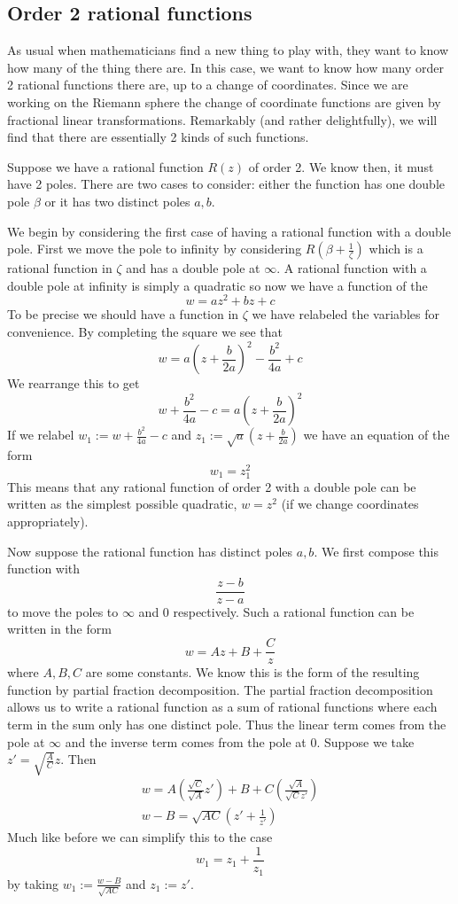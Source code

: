 \subsection{Order 2 rational functions}
As usual when mathematicians find a new thing to play with, they want to know how many of the thing there are. In this case, we want to know how many order 2 rational functions there are, up to a change of coordinates. Since we are working on the Riemann sphere the change of coordinate functions are given by fractional linear transformations. Remarkably (and rather delightfully), we will find that there are essentially 2 kinds of such functions.

Suppose we have a rational function $R(z)$ of order 2. We know then, it must have 2 poles. There are two cases to consider: either the function has one double pole $\beta$ or it has two distinct poles $a, b$.

We begin by considering the first case of having a rational function with a double pole. First we move the pole to infinity by considering $R\left( \beta + \frac{1}{\zeta} \right)$ which is a rational function in $\zeta$ and has a double pole at $\infty$. A rational function with a double pole at infinity is simply a quadratic so now we have a function of the 
$$ w = az^2 + bz + c $$
To be precise we should have a function in $\zeta$ we have relabeled the variables for convenience. By completing the square we see that 
$$ w = a \left( z + \frac{b}{2a} \right)^2 - \frac{b^2}{4a} + c $$
We rearrange this to get 
$$ w + \frac{b^2}{4a} - c = a \left( z + \frac{b}{2a} \right)^2 $$
If we relabel $w_1 := w + \frac{b^2}{4a} - c$ and $z_1 := \sqrt{a} \left( z + \frac{b}{2a} \right)$ we have an equation of the form 
$$w_1 = z_1^2$$
This means that any rational function of order 2 with a double pole can be written as the simplest possible quadratic, $w = z^2$ (if we change coordinates appropriately). 

Now suppose the rational function has distinct poles $a, b$. We first compose this function with 
$$ \frac{z - b}{z - a} $$
to move the poles to $\infty$ and $0$ respectively. Such a rational function can be written in the form
$$ w = Az + B + \frac{C}{z} $$
where $A, B, C$ are some constants. We know this is the form of the resulting function by partial fraction decomposition. The partial fraction decomposition allows us to write a rational function as a sum of rational functions where each term in the sum only has one distinct pole. Thus the linear term comes from the pole at $\infty$ and the inverse term comes from the pole at $0$. Suppose we take $z' = \sqrt{\frac{A}{C}} z$. Then
\begin{align*}
    w = A \left( \frac{\sqrt{C}}{\sqrt{A}} z'\right) + B + C \left( \frac{\sqrt{A}}{\sqrt{C} z'} \right)\\
    w - B = \sqrt{AC} \left(z' + \frac{1}{z'} \right)
\end{align*}
Much like before we can simplify this to the case
$$ w_1 = z_1 + \frac{1}{z_1} $$
by taking $w_1 := \frac{w - B}{\sqrt{AC}}$ and $z_1 := z'$. 

